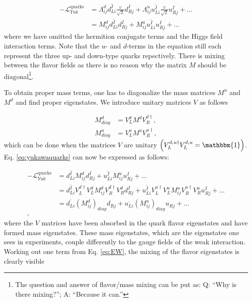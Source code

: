 \begin{equation}
\label{eq:yukawaquarks}
\begin{split}
-\mathcal{L}^{\textrm{quarks}}_{Yuk} &= \Lambda^d_{ij}\overline{d^I_{Li}} \frac{v}{\sqrt{2}}d^I_{Rj} + \Lambda^u_{ij} \overline{u^I_{Li}} \frac{v}{\sqrt{2}} u^I_{Rj} + ...\\
&= M^d_{ij} \overline{d^I_{Li}} d^I_{Rj} + M^u_{ij} \overline{u^I_{Li}} u^I_{Rj} + ...
\end{split}
\end{equation}
where we have omitted the hermition conjugate terms and the Higgs field interaction terms. Note that the $u$- and $d$-terms in the equation still each represent the three up- and down-type quarks repectively. There is mixing between the flavor fields as there is no reason why the matrix $M$ should be diagonal\footnote{The question and answer of flavor/mass mixing can be put as: Q: ``Why is there mixing?''; A: ``Because it can.''}.

To obtain proper mass terms, one has to diagonalize the mass matrices $M^u$ and $M^d$ and find proper eigenstates. We introduce unitary matrices $V$ as follows

\begin{equation}
\begin{split}
M^d_{diag} &= V^d_L M^d V^{d\dagger}_R,\\
M^u_{diag} &= V^u_L M^u V^{u\dagger}_R,
\end{split}
\end{equation}
which can be done when the matrices $V$ are unitary $\left(V^{d,u\dagger}_L V^{d,u}_L = \mathbbm{1}\right)$. Eq. \ref{eq:yukawaquarks} can now be expressed as follows:

\begin{equation}
\begin{split}
-\mathcal{L}^{\textrm{quarks}}_{Yuk} &= \overline{d^I_{Li}} M^d_{ij} d^I_{Rj} + \overline{u^I_{Li}} M^u_{ij} u^I_{Rj} + ...\\
&= \overline{d^I_{Li}} V^{d\dagger}_L V^d_L M^d_{ij} V^{d\dagger}_R V^{d}_R d^I_{Rj} + \overline{u^I_{Li}} V^{u\dagger}_L V^u_L M^u_{ij} V^{u\dagger}_R V^u_R u^I_{Rj} + ...\\
&= \overline{d_{Li}} \left(M^d_{ij}\right)_{diag} d_{Rj} + \overline{u_{Li}} \left(M^u_{ij}\right)_{diag} u_{Rj} + ... \\,
\end{split}
\end{equation}
where the $V$ matrices have been absorbed in the quark flavor eigenstates and have formed mass eigenstates. These mass eigenstates, which are the eigenstates one sees in experiments, couple differently to the gauge fields of the weak interaction. Working out one term from Eq. \ref{eq:EW}, the mixing of the flavor eigenstates is clearly visible

